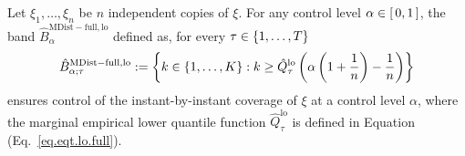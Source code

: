 \documentclass[11pt]{article}
\begin{document}
\begin{proposition}
\label{prop.ibib.mdist.lo.full}
Let $\xi_1, \ldots, \xi_n$ be $n$ independent copies of $\xi$.
%
%
%
For any control level $\alpha \in \left[\, 0, 1 \,\right]$,
the band $\hat{B}^{\mathrm{MDist-full, lo}}_{\alpha}$ defined as,
for every $\tau \in \left\{ 1, \ldots, T \right\}$
\begin{align}
\label{eq.ibib.mdist.lo.full}
    \hat{B}_{\alpha; \tau}^{\mathrm{MDist-full, lo}} := \left\{ 
        k \in \left\{ 1, \ldots, K \right\} :
        k \geq \hat{Q}_{\tau}^{\mathrm{lo}} \left( \alpha \left( 1 + \frac{1}{n} \right) - \frac{1}{n} \right)
     \right\}
\end{align}
ensures control of the instant-by-instant coverage of $\xi$ at a control level $\alpha$,
where the marginal empirical lower quantile function $\hat{Q}_{\tau}^{\mathrm{lo}}$ is defined in Equation (Eq.~\eqref{eq.eqt.lo.full}). 
\end{proposition}
%
%
%
\end{document}
